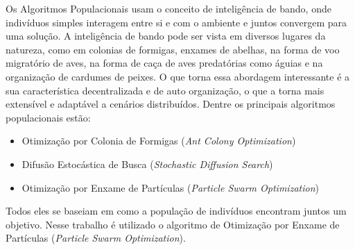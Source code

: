 %
Os Algoritmos Populacionais usam o conceito de inteligência de bando, onde indivíduos simples interagem entre si e com o ambiente e juntos convergem para uma solução. 
%
A inteligência de bando pode ser vista em diversos lugares da natureza, como em colonias de formigas, enxames de abelhas, na forma de voo migratório de aves, na forma de caça de aves predatórias como águias e na organização de cardumes de peixes. 
%
O que torna essa abordagem interessante é a sua característica decentralizada e de auto organização, o que a torna mais extensível e adaptável a cenários distribuídos. 
%
\noindent Dentre os principais algoritmos populacionais estão:
\begin{itemize}
    \item Otimização por Colonia de Formigas (\textit{Ant Colony Optimization}) 
    \item Difusão Estocástica de Busca (\textit{Stochastic Diffusion Search})
    \item Otimização por Enxame de Partículas (\textit{Particle Swarm Optimization})
\end{itemize}
%
\noindent Todos eles se baseiam em como a população de indivíduos encontram juntos um objetivo. Nesse trabalho é utilizado o algoritmo de Otimização por Enxame de Partículas (\textit{Particle Swarm Optimization}). 
%
